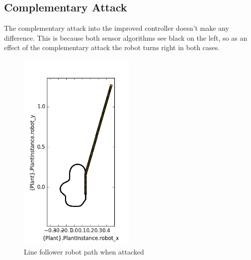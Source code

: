 \subsection{Complementary Attack}

The complementary attack into the improved controller doesn't make any
difference. This is because both sensor algorithms see black on the left, so as
an effect of the complementary attack the robot turns right in both cases.

\begin{figure}[htb]
	\centering
	\includegraphics[width=0.5\textwidth]{img/improve-complementary-attack.png}
	\caption{Line follower robot path when
	attacked}\label{fig:complimpatkresult}
\end{figure}

